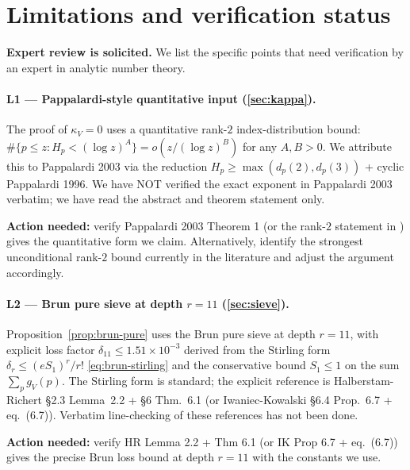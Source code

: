 \documentclass[11pt,a4paper]{article}
\theoremstyle{plain}
\theoremstyle{definition}
\theoremstyle{remark}
\begin{document}

\section{Limitations and verification status}\label{sec:limitations}

\textbf{Expert review is solicited.} We list the specific points that
need verification by an expert in analytic number theory.

\paragraph{L1 --- Pappalardi-style quantitative input
(\cref{sec:kappa}).}
The proof of $\kappa_{V} = 0$ uses a quantitative rank-$2$
index-distribution bound: $\#\{p \leq z : H_{p} < (\log z)^{A}\} =
o(z / (\log z)^{B})$ for any $A, B > 0$. We attribute this to
Pappalardi 2003 via the reduction $H_{p} \geq \max(d_{p}(2),
d_{p}(3))$ + cyclic Pappalardi 1996. We have NOT verified the exact
exponent in Pappalardi 2003 verbatim; we have read the abstract and
theorem statement only.

\textbf{Action needed:} verify Pappalardi 2003 Theorem 1 (or the
rank-$2$ statement in \cite{PappalardiSusa2010}) gives the quantitative
form we claim. Alternatively, identify the strongest unconditional
rank-$2$ bound currently in the literature and adjust the argument
accordingly.

\paragraph{L2 --- Brun pure sieve at depth $r = 11$ (\cref{sec:sieve}).}
Proposition~\ref{prop:brun-pure} uses the Brun pure sieve at depth
$r = 11$, with explicit loss factor $\delta_{11} \leq 1.51 \times
10^{-3}$ derived from the Stirling form
$\delta_{r} \leq (e S_{1})^{r}/r!$ \eqref{eq:brun-stirling} and the
conservative bound $S_{1} \leq 1$ on the sum $\sum_{p} g_{V}(p)$. The
Stirling form is standard; the explicit reference is
Halberstam-Richert \S2.3 Lemma~2.2 + \S6 Thm.~6.1 (or
Iwaniec-Kowalski \S6.4 Prop.~6.7 + eq.~(6.7)). Verbatim line-checking
of these references has not been done.

\textbf{Action needed:} verify HR Lemma 2.2 + Thm 6.1 (or
IK Prop 6.7 + eq.~(6.7)) gives the precise Brun loss bound at depth
$r = 11$ with the constants we use.
\end{document}

